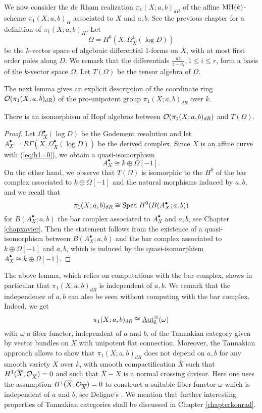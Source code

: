 We now consider the de Rham realization $\pi_1(X;a,b)_{dR}$  of the affine $\textnormal{MH}(k)$-scheme $\pi_1(X;a,b)_H$ associated to $X$ and $a,b$. See the previous chapter for a definition of $\pi_1(X;a,b)_H$. 
Let $$\Omega= H^0(\overline{X}, \Omega_{\overline{X}}^1(\log D))$$ be the $k$-vector space of algebraic differential 1-forms on $\overline{X}$, with at most first order poles along $D$. We remark that the differentials $\frac{dz}{z-a_i}, 1\leq i\leq r$, form a basis of the $k$-vector space $\Omega$. Let $T(\Omega)$ be the tensor algebra of $\Omega$. 

The next lemma gives an explicit description of the coordinate ring  $\mathcal{O}(\pi_1(X;a,b)_{dR})$ of the pro-unipotent group $\pi_1(X;a,b)_{dR}$ over $k$.

\begin{lemma}\label{lem:explicitderham}
There is an isomorphism of Hopf algebras between $\mathcal{O}(\pi_1(X;a,b)_{dR})$ and $T(\Omega).$
\end{lemma}
\begin{proof}
Let $\Omega_{\overline{X}}^{\bullet}(\log D)$ be the Godement resolution and let $A_X^{\bullet} = R\Gamma(\overline{X}, \Omega^{\bullet}_{\overline{X}}(\log D))$ be the derived complex. 
Since $X$ is an affine curve with (\ref{eq:h1=0}), we obtain a quasi-isomorphism
 $$A_X^{\bullet}\cong k\oplus \Omega[-1].$$ 
On the other hand, we observe that $T(\Omega)$ is isomorphic to the $H^0$ of the bar complex associated to $k\oplus \Omega[-1]$ and the natural morphisms induced by $a,b$, 
and we recall that $$\pi_1(X;a,b)_{dR}\cong\mathrm{Spec}~ H^0(B(A_X^{\bullet};a,b))$$ for $B(A_X^{\bullet};a,b)$ the bar complex associated to $A_X^{\bullet}$ and $a,b$, see Chapter \ref{chapxavier}. 
Then the statement follows from the existence of a quasi-isomorphism between $B(A_X^{\bullet};a,b)$ and the bar complex associated to $k\oplus \Omega[-1]$ and $a,b$, which is induced by the quasi-isomorphism $A_X^{\bullet}\cong k\oplus \Omega[-1]$.
\end{proof}
The above lemma, which relies on computations with the bar complex, shows in particular that $\pi_1(X;a,b)_{dR}$ is independent of $a,b$. 
We remark that the independence of $a,b$ can also be seen without computing with the bar complex. 
Indeed, we get $$\pi_1(X;a,b)_{dR}\cong\underline{\textnormal{Aut}}^{\otimes}_k(\omega)$$ with $\omega$ a fiber functor, independent of $a$ and $b$, of the Tannakian category given by vector bundles on $X$ with unipotent flat connection. 
Moreover, the Tannakian approach allows to show  that $\pi_1(X;a,b)_{dR}$ does not depend on $a,b$ for any smooth variety $X$ over $k$, with smooth compactification  $\overline{X}$ such that $H^1(\overline{X},\mathcal{O}_{\overline{X}})=0$ and such that $\overline{X}-X$ is a normal crossing divisor. Here one uses the assumption $H^1(\overline{X},\mathcal{O}_{\overline{X}})=0$ to construct a suitable fiber functor $\omega$ which is independent of $a$ and $b$, see Deligne's \cite[Section 12]{deligne:galoisgroups}.
We mention that further interesting properties of Tannakian categories shall be discussed in Chapter \ref{chapterkonrad}. 



